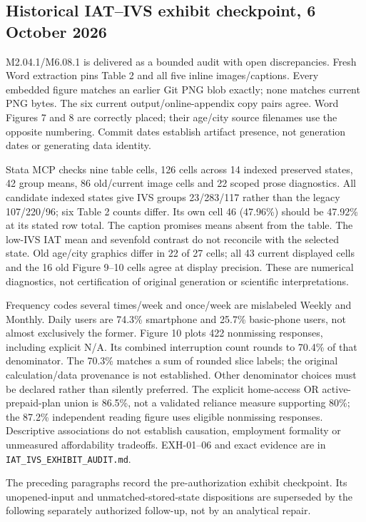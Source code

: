 \documentclass[11pt,a4paper]{article}
\begin{document}
\subsection{Historical IAT--IVS exhibit checkpoint, 6 October 2026}
M2.04.1/M6.08.1 is delivered as a bounded audit with open discrepancies.
Fresh Word extraction pins Table 2 and all five inline images/captions.
Every embedded figure matches an earlier Git PNG blob exactly; none matches
current PNG bytes. The six current output/online-appendix copy pairs agree.
Word Figures 7 and 8 are correctly placed; their age/city source filenames
use the opposite numbering. Commit dates establish artifact presence, not
generation dates or generating data identity.

Stata MCP checks nine table cells, 126 cells across 14 indexed preserved
states, 42 group means, 86 old/current image cells and 22 scoped prose
diagnostics. All candidate indexed states give IVS groups 23/283/117 rather
than the legacy 107/220/96; six Table 2 counts differ. Its own cell
46 (47.96\%) should be 47.92\% at its stated row total. The caption promises
means absent from the table. The low-IVS IAT mean and sevenfold contrast
do not reconcile with the selected state. Old age/city graphics differ in
22 of 27 cells; all 43 current displayed cells and the 16 old Figure 9--10
cells agree at display precision. These are numerical diagnostics, not
certification of original generation or scientific interpretations.

Frequency codes several times/week and once/week are mislabeled Weekly
and Monthly. Daily users are 74.3\% smartphone and 25.7\% basic-phone users,
not almost exclusively the former. Figure 10 plots 422 nonmissing responses,
including explicit N/A. Its combined interruption count rounds to 70.4\%
of that denominator. The 70.3\% matches a sum of rounded slice labels;
the original calculation/data provenance is not established.
Other denominator choices must be declared rather than silently preferred.
The explicit home-access OR active-prepaid-plan union is 86.5\%, not a
validated reliance measure supporting 80\%; the 87.2\% independent
reading figure uses eligible nonmissing responses. Descriptive associations
do not establish causation, employment formality or unmeasured affordability
tradeoffs. EXH-01--06 and exact evidence are in
\texttt{IAT\_IVS\_EXHIBIT\_AUDIT.md}.

The preceding paragraphs record the pre-authorization exhibit checkpoint.
Its unopened-input and unmatched-stored-state dispositions are superseded by
the following separately authorized follow-up, not by an analytical repair.
\end{document}
